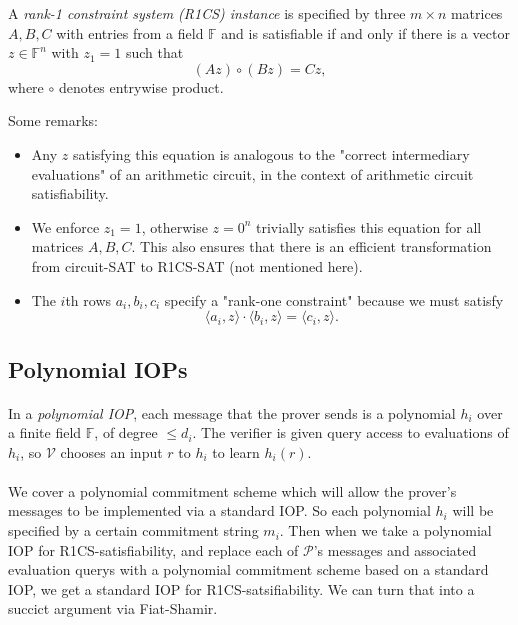 \documentclass[11pt]{article}
\begin{document}
\begin{definition}
    A \textit{rank-1 constraint system (R1CS) instance} is specified by three $m \times n$ matrices $A, B, C$ with entries from a field $\mathbb{F}$ and is satisfiable if and only if there is a vector $z \in \mathbb{F}^n$ with $z_1 = 1$ such that
    \[ (Az) \circ (Bz) = Cz, \]
    where $\circ$ denotes entrywise product.
\end{definition}
Some remarks:
\begin{itemize}
    \item Any $z$ satisfying this equation is analogous to the "correct intermediary evaluations" of an arithmetic circuit, in the context of arithmetic circuit satisfiability.
    \item We enforce $z_1 = 1$, otherwise $z = 0^n$ trivially satisfies this equation for all matrices $A, B, C$. This also ensures that there is an efficient transformation from circuit-SAT to R1CS-SAT (not mentioned here).
    \item The $i$th rows $a_i, b_i, c_i$ specify a "rank-one constraint" because we must satisfy
    \[ \langle a_i, z \rangle \cdot \langle b_i, z \rangle = \langle c_i, z \rangle. \]
\end{itemize}

\subsection{Polynomial IOPs}
\paragraph{} In a \textit{polynomial IOP}, each message that the prover sends is a polynomial $h_i$ over a finite field $\mathbb{F}$, of degree $\leq d_i$. The verifier is given query access to evaluations of $h_i$, so $\mathcal{V}$ chooses an input $r$ to $h_i$ to learn $h_i(r)$.

\paragraph{} We cover a polynomial commitment scheme which will allow the prover's messages to be implemented via a standard IOP. So each polynomial $h_i$ will be specified by a certain commitment string $m_i$. Then when we take a polynomial IOP for R1CS-satisfiability, and replace each of $\mathcal{P}$'s messages and associated evaluation querys with a polynomial commitment scheme based on a standard IOP, we get a standard IOP for R1CS-satsifiability. We can turn that into a succict argument via Fiat-Shamir.
\end{document}
